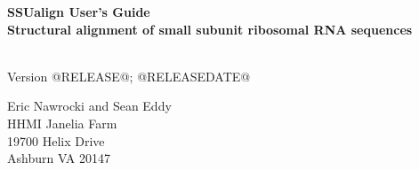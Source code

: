 \begin{titlepage}
{\Large

\vspace*{\fill}


\begin{center}
{\Huge \textbf{SSUalign User's Guide}}\\
{\large \textbf{Structural alignment of small subunit ribosomal RNA
    sequences}}\\
\end{center}

\vspace*{\fill}

\begin{center}
\textsl{}\\
Version @RELEASE@; @RELEASEDATE@ \\ 

\vspace*{\fill}

Eric Nawrocki and Sean Eddy\\
HHMI Janelia Farm\\
19700 Helix Drive\\
Ashburn VA 20147\\
\textsl{} \\
\end{center}

\vspace*{\fill}

}
\end{titlepage}
